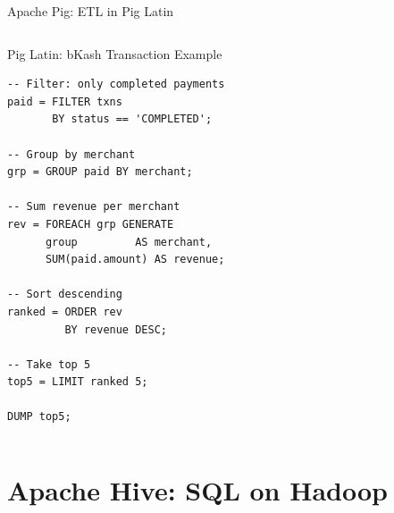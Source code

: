 \documentclass[aspectratio=169,10pt]{beamer}
\begin{document}
\begin{frame}[fragile]{Apache Pig: ETL in Pig Latin}
\begin{columns}[T]
\begin{exampleblock}{Pig Latin: bKash Transaction Example}
\begin{lstlisting}[language={},
            title={Find top-5 merchants by total revenue}]
-- Filter: only completed payments
paid = FILTER txns
       BY status == 'COMPLETED';

-- Group by merchant
grp = GROUP paid BY merchant;

-- Sum revenue per merchant
rev = FOREACH grp GENERATE
      group         AS merchant,
      SUM(paid.amount) AS revenue;

-- Sort descending
ranked = ORDER rev
         BY revenue DESC;

-- Take top 5
top5 = LIMIT ranked 5;

DUMP top5;
        \end{lstlisting}
      \end{exampleblock}
  \end{columns}
\end{frame}

\section{Apache Hive: SQL on Hadoop}
\end{document}

